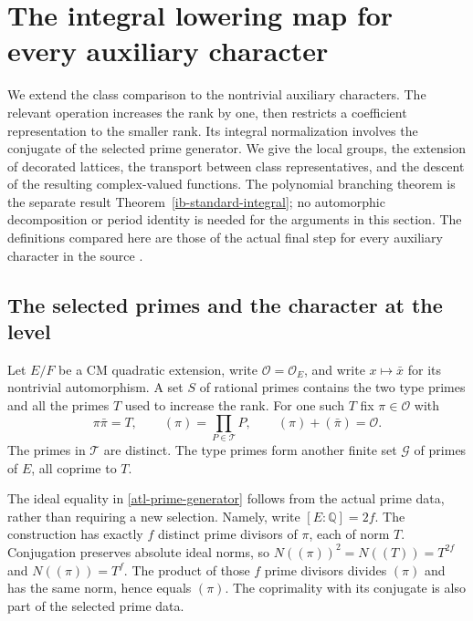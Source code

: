 \section{The integral lowering map for every auxiliary character}
\label{atl-section}

We extend the class comparison to the nontrivial auxiliary
characters.  The relevant operation increases the rank by one,
then restricts a coefficient representation to the smaller rank.
Its integral normalization involves the conjugate of the selected
prime generator.  We give the local groups, the extension of
decorated lattices, the transport between class representatives,
and the descent of the resulting complex-valued functions.
The polynomial branching theorem is the separate result
Theorem~\ref{ib-standard-integral}; no automorphic decomposition
or period identity is needed for the arguments in this section.
The definitions compared here are those of the actual final
step for every auxiliary character in the source
\cite{alpo-uniform-source}.

\subsection{The selected primes and the character at the level}

Let $E/F$ be a CM quadratic extension, write
$\mathcal O=\mathcal O_E$, and write $x\mapsto\bar x$ for
its nontrivial automorphism.  A set $S$ of rational primes
contains the two type primes and all the primes $T$ used to
increase the rank.  For one such $T$ fix $\pi\in\mathcal O$
with
\begin{equation}\label{atl-prime-generator}
 \pi\bar\pi=T,\qquad
 (\pi)=\prod_{P\in\mathcal T}P,\qquad
 (\pi)+(\bar\pi)=\mathcal O.
\end{equation}
The primes in $\mathcal T$ are distinct.  The type primes
form another finite set $\mathcal G$ of primes of $E$, all
coprime to $T$.

The ideal equality in \eqref{atl-prime-generator} follows
from the actual prime data, rather than requiring a new
selection.  Namely, write $[E:\mathbb Q]=2f$.  The construction
has exactly $f$ distinct prime divisors of $\pi$, each of norm
$T$.  Conjugation preserves absolute ideal norms, so
$N((\pi))^2=N((T))=T^{2f}$ and $N((\pi))=T^f$.
The product of those $f$ prime divisors divides $(\pi)$
and has the same norm, hence equals $(\pi)$.  The coprimality
with its conjugate is also part of the selected prime data.

